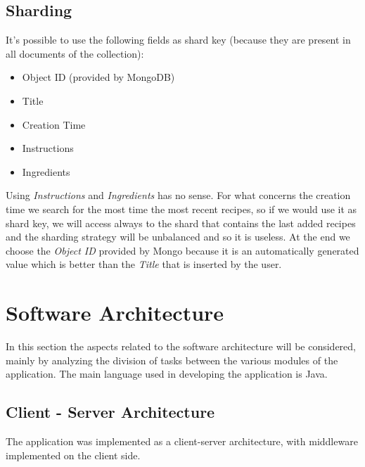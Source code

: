 \documentclass[a4paper]{report}
\begin{document}
\subsection{Sharding}
It's possible to use the following fields as shard key (because they are present in all documents of the collection):
\begin{itemize}
	\item Object ID (provided by MongoDB)
	\item Title
	\item Creation Time
	\item Instructions
	\item Ingredients
\end{itemize}

\noindent Using \emph{Instructions} and \emph{Ingredients} has no sense. For what concerns the creation time we search for the most time the most recent recipes, so if we would use it as shard key, we will access always to the shard that contains the last added recipes and the sharding strategy will be unbalanced and so it is useless. At the end we choose the \emph{Object ID} provided by Mongo because it is an automatically generated value which is better than the \emph{Title} that is inserted by the user.


\section{Software Architecture}
In this section the aspects related to the software architecture will be considered, mainly by analyzing the division of tasks between the various modules of the application. The main language used in developing the application is Java.
\subsection{Client - Server Architecture}
The application was implemented as a client-server architecture, with middleware implemented on the client side.
\end{document}
